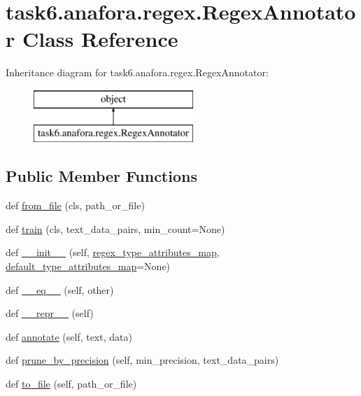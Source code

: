 \hypertarget{classtask6_1_1anafora_1_1regex_1_1RegexAnnotator}{}\section{task6.\+anafora.\+regex.\+Regex\+Annotator Class Reference}
\label{classtask6_1_1anafora_1_1regex_1_1RegexAnnotator}
Inheritance diagram for task6.\+anafora.\+regex.\+Regex\+Annotator\+:\begin{figure}[H]
\begin{center}
\leavevmode
\includegraphics[height=2.000000cm]{classtask6_1_1anafora_1_1regex_1_1RegexAnnotator}
\end{center}
\end{figure}
\subsection*{Public Member Functions}
\begin{DoxyCompactItemize}
\item 
def \hyperlink{classtask6_1_1anafora_1_1regex_1_1RegexAnnotator_ace3b9403ea6504f3971ed8d8fb6c8f06}{from\+\_\+file} (cls, path\+\_\+or\+\_\+file)
\item 
def \hyperlink{classtask6_1_1anafora_1_1regex_1_1RegexAnnotator_ad0474bb10d3386a3e8cdc34618d4af9e}{train} (cls, text\+\_\+data\+\_\+pairs, min\+\_\+count=None)
\item 
def \hyperlink{classtask6_1_1anafora_1_1regex_1_1RegexAnnotator_a3ee5a8a515d009200169587e66d17a8c}{\+\_\+\+\_\+init\+\_\+\+\_\+} (self, \hyperlink{classtask6_1_1anafora_1_1regex_1_1RegexAnnotator_a01da64138702436e84e00de752e065e8}{regex\+\_\+type\+\_\+attributes\+\_\+map}, \hyperlink{classtask6_1_1anafora_1_1regex_1_1RegexAnnotator_ae2480f04c3c25ad145dc4738ca7d7df8}{default\+\_\+type\+\_\+attributes\+\_\+map}=None)
\item 
def \hyperlink{classtask6_1_1anafora_1_1regex_1_1RegexAnnotator_ad2dc1278ff2bd78a9a5316f8c9116a86}{\+\_\+\+\_\+eq\+\_\+\+\_\+} (self, other)
\item 
def \hyperlink{classtask6_1_1anafora_1_1regex_1_1RegexAnnotator_af27e3a0223c17fbc69a369f941578d60}{\+\_\+\+\_\+repr\+\_\+\+\_\+} (self)
\item 
def \hyperlink{classtask6_1_1anafora_1_1regex_1_1RegexAnnotator_a25ba4f8958ed28ed8354a050507ae4ed}{annotate} (self, text, data)
\item 
def \hyperlink{classtask6_1_1anafora_1_1regex_1_1RegexAnnotator_a0978b0b00a66a7110cb190fca5d17eaf}{prune\+\_\+by\+\_\+precision} (self, min\+\_\+precision, text\+\_\+data\+\_\+pairs)
\item 
def \hyperlink{classtask6_1_1anafora_1_1regex_1_1RegexAnnotator_a6a39226ac10e1f494d4d4b5073f10d15}{to\+\_\+file} (self, path\+\_\+or\+\_\+file)
\end{DoxyCompactItemize}
